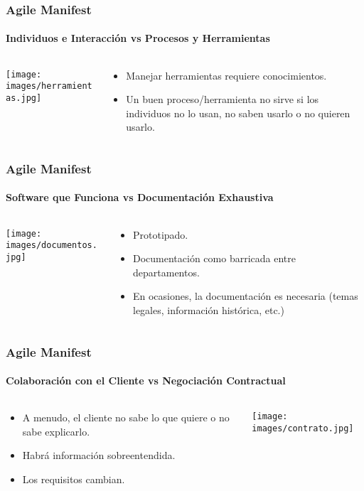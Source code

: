 {   \usebackgroundtemplate{}

  \begin{frame}
   \frametitle{Agile Manifest}
   \framesubtitle{Individuos e Interacción vs Procesos y Herramientas}

   \begin{columns}
    \begin{column}{4cm}
     \texttt{[image: images/herramientas.jpg]}
    \end{column}
    \begin{column}{7cm}
     \begin{itemize}
      \item Manejar herramientas requiere conocimientos.
      \item Un buen proceso/herramienta no sirve si los individuos no lo usan, no saben usarlo o no quieren usarlo.
     \end{itemize}
    \end{column}
   \end{columns}
  \end{frame}


  \begin{frame}
   \frametitle{Agile Manifest}
   \framesubtitle{Software que Funciona vs Documentación Exhaustiva}

   \begin{columns}
    \begin{column}{4cm}
     \texttt{[image: images/documentos.jpg]}
    \end{column}
    \begin{column}{7cm}
     \begin{itemize}
      \item Prototipado.
      \item Documentación como barricada entre departamentos.
      \item En ocasiones, la documentación es necesaria (temas legales, información histórica, etc.)
     \end{itemize}
    \end{column}
   \end{columns}
  \end{frame}

  \begin{frame}
   \frametitle{Agile Manifest}
   \framesubtitle{Colaboración con el Cliente vs Negociación Contractual}

   \begin{columns}
    \begin{column}{7cm}
     \begin{itemize}
      \item A menudo, el cliente no sabe lo que quiere o no sabe explicarlo.
      \item Habrá información sobreentendida.
      \item Los requisitos cambian.
     \end{itemize}
    \end{column}
    \begin{column}{4cm}
     \texttt{[image: images/contrato.jpg]}
    \end{column}
   \end{columns}
  \end{frame}

}
